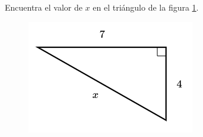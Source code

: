 Encuentra el valor de $x$ en el triángulo de la figura \ref{fig:lados_pitagoras_20}.

\begin{minipage}[t][][t]{0.35\textwidth}
    \begin{figure}[H]
        \centering
        \includegraphics[width=0.9\linewidth]{../images/lados_pitagoras_20.png}

        \caption{}
        \label{fig:lados_pitagoras_20}
    \end{figure}
\end{minipage}\hfill
